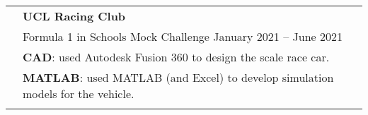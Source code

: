 \documentclass[letterpaper, 11pt]{article}
\begin{document}
\begin{longtable}{p{1.3in}p{4.8in}}



    \nohyphens{\color{OliveGreen}{Relevant experience}}
     & \textbf{UCL Racing Club}                                                                                                                                                                                           \\
     & Formula 1 in Schools Mock Challenge \hfill January 2021 -- June 2021                                                                                                                                               \\
     & \textbf{CAD}: used Autodesk Fusion 360 to design the scale race car.                                                                                                                                               \\
     & \textbf{MATLAB}: used MATLAB (and Excel) to develop simulation models for the vehicle.                                                                                                                             \\
     &                                                                                                                                                                                                                    \\


\end{longtable}
\end{document}
